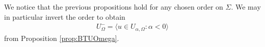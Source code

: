 \documentclass[12pt]{amsart}
\newcommand{\F}{\mathbb{F} }
\newcommand{\frakg}{\mathfrak{g}}
\numberwithin{equation}{section}
\newtheorem{lemma}[theorem]{Lemma}
\theoremstyle{remark} %
\begin{document}
		We notice that the previous propositions hold for any chosen order on $\Sigma$. We may in particular invert the order to obtain
		\begin{align*}
			U_\Omega^- = \langle u \in U_{\alpha,\Omega} \colon \alpha < 0 \rangle 
		\end{align*}
		from Proposition \ref{prop:BTUOmega}. 
\end{document}
